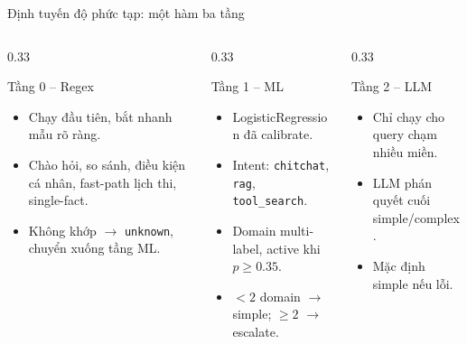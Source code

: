 \documentclass[t, aspectratio=169]{beamer}
\begin{document}
	\begin{frame}{Định tuyến độ phức tạp: một hàm ba tầng}
		\begin{columns}[T,onlytextwidth]
			\begin{column}{0.33\textwidth}
				\begin{block}{Tầng 0 -- Regex}
					\scriptsize
					\begin{itemize}
						\item Chạy đầu tiên, bắt nhanh mẫu rõ ràng.
						\item Chào hỏi, so sánh, điều kiện cá nhân, fast-path lịch thi, single-fact.
						\item Không khớp $\rightarrow$ \texttt{unknown}, chuyển xuống tầng ML.
					\end{itemize}
				\end{block}
			\end{column}
			\begin{column}{0.33\textwidth}
				\begin{block}{Tầng 1 -- ML}
					\scriptsize
					\begin{itemize}
						\item LogisticRegression đã calibrate.
						\item Intent: \texttt{chitchat}, \texttt{rag}, \texttt{tool\_search}.
						\item Domain multi-label, active khi $p \geq 0.35$.
						\item $<2$ domain $\rightarrow$ simple; $\geq 2$ $\rightarrow$ escalate.
					\end{itemize}
				\end{block}
			\end{column}
			\begin{column}{0.33\textwidth}
				\begin{block}{Tầng 2 -- LLM}
					\scriptsize
					\begin{itemize}
						\item Chỉ chạy cho query chạm nhiều miền.
						\item LLM phán quyết cuối simple/complex.
						\item Mặc định simple nếu lỗi.
					\end{itemize}
				\end{block}
			\end{column}
		\end{columns}
	\end{frame}
\end{document}
